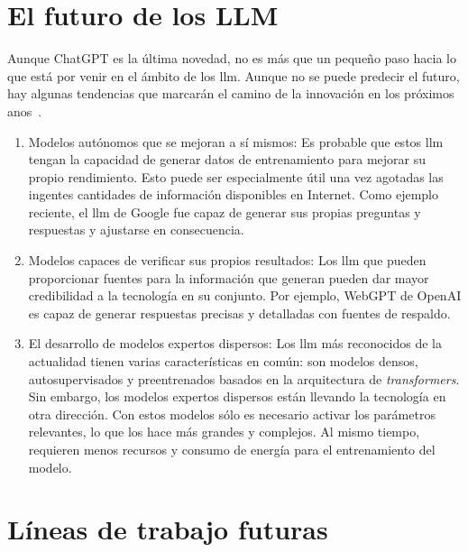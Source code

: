 
\section{El futuro de los LLM}

Aunque ChatGPT es la última novedad, no es más que un pequeño paso hacia lo que está por venir en el ámbito de los \acrshort{llm}. Aunque no se puede predecir el futuro, hay algunas tendencias que marcarán el camino de la innovación en los próximos anos~\cite{Tolaka}.

\begin{enumerate}
    
\item Modelos autónomos que se mejoran a sí mismos: Es probable que estos \acrshort{llm} tengan la capacidad de generar datos de entrenamiento para mejorar su propio rendimiento. Esto puede ser especialmente útil una vez agotadas las ingentes cantidades de información disponibles en Internet. Como ejemplo reciente, el \acrshort{llm} de Google fue capaz de generar sus propias preguntas y respuestas y ajustarse en consecuencia.

\item Modelos capaces de verificar sus propios resultados: Los \acrshort{llm} que pueden proporcionar fuentes para la información que generan pueden dar mayor credibilidad a la tecnología en su conjunto. Por ejemplo, WebGPT de OpenAI es capaz de generar respuestas precisas y detalladas con fuentes de respaldo.

\item El desarrollo de modelos expertos dispersos: Los \acrshort{llm} más reconocidos de la actualidad tienen varias características en común: son modelos densos, autosupervisados y preentrenados basados en la arquitectura de \textit{transformers}. Sin embargo, los modelos expertos dispersos están llevando la tecnología en otra dirección. Con estos modelos sólo es necesario activar los parámetros relevantes, lo que los hace más grandes y complejos. Al mismo tiempo, requieren menos recursos y consumo de energía para el entrenamiento del modelo.

\end{enumerate}

\section{Líneas de trabajo futuras}

